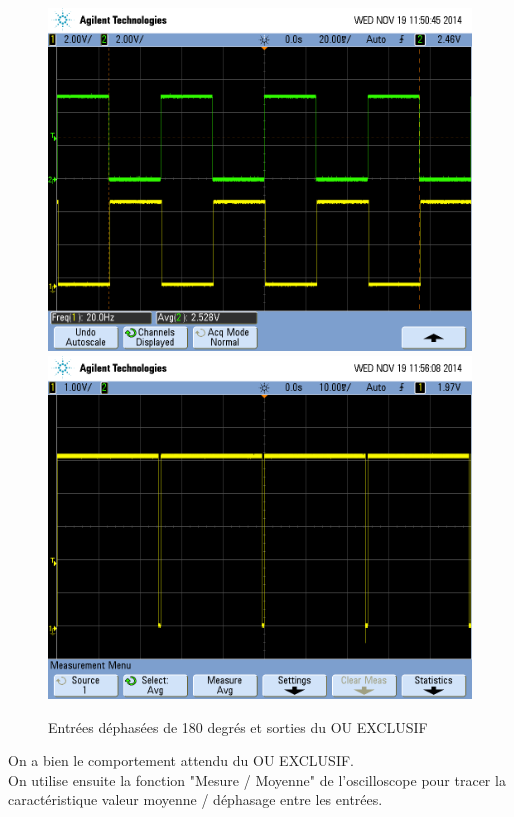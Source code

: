 \documentclass[../../Cours_M1.tex]{subfiles}
\begin{document}
\begin{figure}[h!]
\centering
\includegraphics[scale=0.2]{AATC/II180.PNG}
\includegraphics[scale=0.2]{AATC/II180XOR.PNG}
\caption{Entrées déphasées de 180 degrés et sorties du OU EXCLUSIF}
\end{figure}

On a bien le comportement attendu du OU EXCLUSIF.\\

On utilise ensuite la fonction "Mesure / Moyenne" de l'oscilloscope pour tracer la caractéristique valeur moyenne / déphasage entre les entrées.\\
\end{document}
